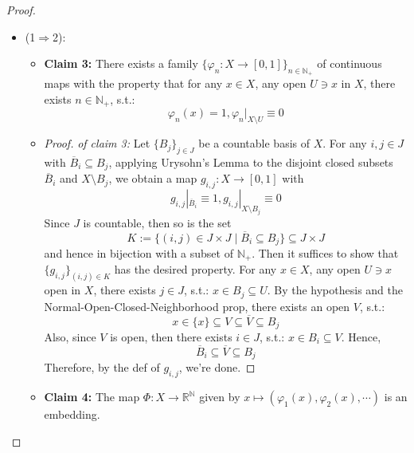 \begin{proof}
\begin{itemize}
        \item (1$\Rightarrow$2): \begin{itemize}
            \item \textbf{Claim 3:} There exists a family $\{ \varphi_n: X\to [0,1] \}_{n \in \mathbb{N}_+}$ of continuous maps with the property that for any $x \in X$, any open $U \ni x$ in $X$, there exists $n \in \mathbb{N}_+$, s.t.:
            $$\varphi_n(x) =1,\varphi_n |_{X \setminus U} \equiv 0$$

            \item \begin{proof}
                \textit{of claim 3:} Let $\{B_j\}_{j \in J}$ be a countable basis of $X$. For any $i,j \in J$ with $\overline{B}_i \subseteq B_j$, applying Urysohn's Lemma to the disjoint closed subsets $\overline{B}_i$ and $X\setminus B_j$, we obtain a map $g_{i,j}: X \to [0,1]$ with
                $$g_{i,j}|_{\overline{B}_i} \equiv 1, g_{i,j}|_{X \setminus B_j} \equiv 0$$
                Since $J$ is countable, then so is the set
                $$K:= \{(i,j) \in J \times J \mid \overline{B}_i \subseteq B_j\} \subseteq J \times J$$
                and hence in bijection with a subset of $\mathbb{N}_+$. Then it suffices to show that $\{g_{i,j} \}_{(i,j) \in K}$ has the desired property. For any $x \in X$, any open $U \ni x$ open in $X$, there exists $j \in J$, s.t.: $x \in B_j \subseteq U$. By the hypothesis and the Normal-Open-Closed-Neighborhood prop, there exists an open $V$, s.t.:
                $$x \in \{ x\} \subseteq V \subseteq \overline{V} \subseteq B_j$$
                Also, since $V$ is open, then there exists $i \in J$, s.t.:
                $x \in B_i \subseteq V$. Hence,
                $$\overline{B}_i \subseteq \overline{V} \subseteq B_j$$
                Therefore, by the def of $g_{i,j}$, we're done.
            \end{proof}

            \item \textbf{Claim 4:} The map $\Phi: X \to \mathbb{R}^\mathbb{N}$ given by $x \mapsto (\varphi_1 (x), \varphi_2 (x),\cdots)$ is an embedding.


\end{itemize}
\end{itemize}
\end{proof}
